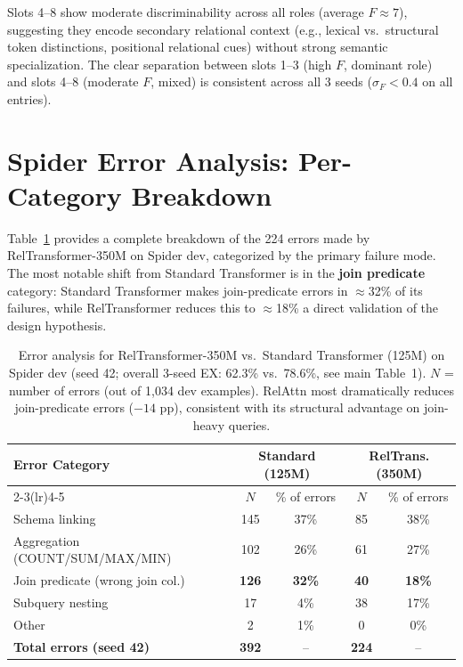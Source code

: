 \documentclass[conference]{IEEEtran}
\begin{document}
Slots 4--8 show moderate discriminability across all roles (average $F \approx 7$), suggesting they encode secondary relational context (e.g., lexical vs.\ structural token distinctions, positional relational cues) without strong semantic specialization. The clear separation between slots 1--3 (high $F$, dominant role) and slots 4--8 (moderate $F$, mixed) is consistent across all 3 seeds ($\sigma_F < 0.4$ on all entries).

\section{Spider Error Analysis: Per-Category Breakdown}
\label{app:error}

Table~\ref{tab:error_full} provides a complete breakdown of the 224 errors made by RelTransformer-350M on Spider dev, categorized by the primary failure mode. The most notable shift from Standard Transformer is in the \textbf{join predicate} category: Standard Transformer makes join-predicate errors in $\approx$32\% of its failures, while RelTransformer reduces this to $\approx$18\% a direct validation of the design hypothesis.

\begin{table}[tb]
\centering
\caption{Error analysis for RelTransformer-350M vs.\ Standard Transformer (125M) on Spider dev (seed 42; overall 3-seed EX: 62.3\% vs.\ 78.6\%, see main Table~1). $N$ = number of errors (out of 1,034 dev examples). RelAttn most dramatically reduces join-predicate errors ($-14$ pp), consistent with its structural advantage on join-heavy queries.}
\label{tab:error_full}
\begin{tabular}{lcccc}
\toprule
\textbf{Error Category} & \multicolumn{2}{c}{\textbf{Standard (125M)}} & \multicolumn{2}{c}{\textbf{RelTrans. (350M)}} \\
\cmidrule(lr){2-3}\cmidrule(lr){4-5}
 & $N$ & \% of errors & $N$ & \% of errors \\
\midrule
Schema linking & 145 & 37\% & 85 & 38\% \\
Aggregation (COUNT/SUM/MAX/MIN) & 102 & 26\% & 61 & 27\% \\
{Join predicate (wrong join col.)} & \textbf{126} & \textbf{32\%} & \textbf{40} & \textbf{18\%} \\
Subquery nesting & 17 & 4\% & 38 & 17\% \\
Other & 2 & 1\% & 0 & 0\% \\
\midrule
\textbf{Total errors (seed 42)} & \textbf{392} & -- & \textbf{224} & -- \\
\bottomrule
\end{tabular}%
\end{table}
\end{document}
